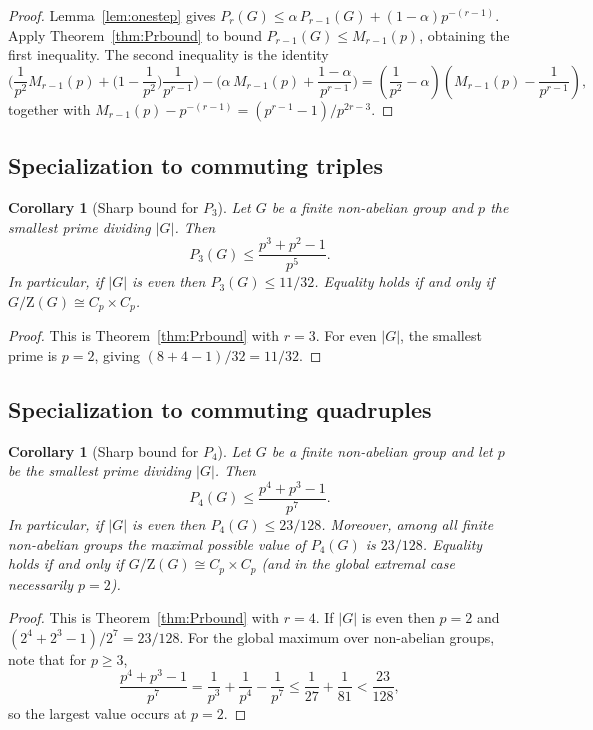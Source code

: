 \documentclass[11pt]{article}
\newtheorem{corollary}[theorem]{Corollary}
\theoremstyle{definition}
\theoremstyle{remark}
\theoremstyle{definition}
\theoremstyle{plain}
\newcommand{\Z}{\mathrm{Z}}
\begin{document}
\begin{proof}
Lemma~\ref{lem:onestep} gives $P_r(G)\le \alpha\,P_{r-1}(G)+(1-\alpha)p^{-(r-1)}$.
Apply Theorem~\ref{thm:Prbound} to bound $P_{r-1}(G)\le M_{r-1}(p)$, obtaining the first inequality.
The second inequality is the identity
\[
\Big(\frac{1}{p^2}M_{r-1}(p)+\Big(1-\frac{1}{p^2}\Big)\frac{1}{p^{r-1}}\Big)-\Big(\alpha\,M_{r-1}(p)+\frac{1-\alpha}{p^{r-1}}\Big)
=\left(\frac{1}{p^2}-\alpha\right)\left(M_{r-1}(p)-\frac{1}{p^{r-1}}\right),
\]
together with $M_{r-1}(p)-p^{-(r-1)}=(p^{r-1}-1)/p^{2r-3}$.
\end{proof}

\subsection{Specialization to commuting triples}
\begin{corollary}[Sharp bound for $P_3$]\label{cor:P3bound}
Let $G$ be a finite non-abelian group and $p$ the smallest prime dividing $|G|$.
Then
\[
P_3(G)\le \frac{p^3+p^2-1}{p^5}.
\]
In particular, if $|G|$ is even then $P_3(G)\le 11/32$.
Equality holds if and only if $G/\Z(G)\cong C_p\times C_p$.
\end{corollary}

\begin{proof}
This is Theorem~\ref{thm:Prbound} with $r=3$.
For even $|G|$, the smallest prime is $p=2$, giving $(8+4-1)/32=11/32$.
\end{proof}

\subsection{Specialization to commuting quadruples}
\begin{corollary}[Sharp bound for $P_4$]\label{cor:P4bound}
Let $G$ be a finite non-abelian group and let $p$ be the smallest prime dividing $|G|$.
Then
\[
P_4(G)\le \frac{p^4+p^3-1}{p^7}.
\]
In particular, if $|G|$ is even then $P_4(G)\le 23/128$.
Moreover, among all finite non-abelian groups the maximal possible value of $P_4(G)$ is $23/128$.
Equality holds if and only if $G/\Z(G)\cong C_p\times C_p$ (and in the global extremal case necessarily $p=2$).
\end{corollary}

\begin{proof}
This is Theorem~\ref{thm:Prbound} with $r=4$.
If $|G|$ is even then $p=2$ and $(2^4+2^3-1)/2^7=23/128$.
For the global maximum over non-abelian groups, note that for $p\ge 3$,
\[
\frac{p^4+p^3-1}{p^7}= \frac{1}{p^3}+\frac{1}{p^4}-\frac{1}{p^7}\le \frac{1}{27}+\frac{1}{81}<\frac{23}{128},
\]
so the largest value occurs at $p=2$.
\end{proof}
\end{document}
